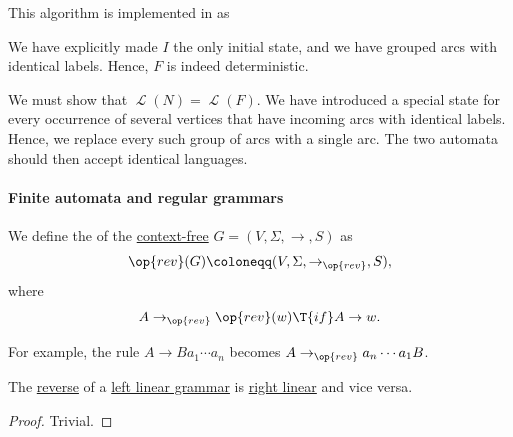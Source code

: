 \begin{comments}
\item This algorithm is implemented in \cite{notebook:code} as
  \begin{CodeRefDisplay}
  \end{CodeRefDisplay}
\end{comments}
\begin{defproof}
  We have explicitly made \( I \) the only initial state, and we have grouped arcs with identical labels. Hence, \( F \) is indeed deterministic.

  We must show that \( \mscrL(N) = \mscrL(F) \). We have introduced a special state for every occurrence of several vertices that have incoming arcs with identical labels. Hence, we replace every such group of arcs with a single arc. The two automata should then accept identical languages.
\end{defproof}

\paragraph{Finite automata and regular grammars}

\begin{definition}\label{def:reverse_grammar}
  We define the  of the \hyperref[def:chomsky_hierarchy/context_free]{context-free} \( G = (V, \Sigma, \to, S) \) as
  \begin{equation*}
    \op{rev}(G) \coloneqq (V, \Sigma, \to_{\op{rev}}, S),
  \end{equation*}
  where
  \begin{equation*}
    A \to_{\op{rev}} \op{rev}(w) \T{if} A \to w.
  \end{equation*}
\end{definition}
\begin{comments}
  \item For example, the rule \( A \to Ba_1 \cdots a_n \) becomes \( A \to_{\op{rev}} a_n \cdots a_1 B \).
\end{comments}

\begin{proposition}\label{thm:reverse_linear_grammar}
  The \hyperref[def:reverse_grammar]{reverse} of a \hyperref[def:chomsky_hierarchy/regular]{left linear grammar} is \hyperref[def:chomsky_hierarchy/regular]{right linear} and vice versa.
\end{proposition}
\begin{proof}
  Trivial.
\end{proof}

